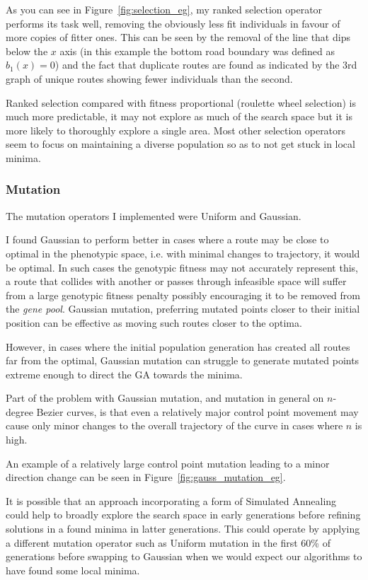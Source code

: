 As you can see in Figure~\ref{fig:selection_eg}, my ranked selection operator performs its task well, removing the obviously less fit individuals in favour of more copies of  fitter ones. This can be seen by the removal of the line that dips below the $x$ axis (in this example the bottom road boundary was defined as $b_{1}(x) = 0 $) and the fact that duplicate routes are found as indicated by the 3rd graph of unique routes showing fewer individuals than the second.

Ranked selection compared with fitness proportional (roulette wheel selection) is much more predictable, it may not explore as much of the search space but it is more likely to thoroughly explore a single area. Most other selection operators seem to focus on maintaining a diverse population so as to not get stuck in local minima.

\subsubsection{Mutation}

The mutation operators I implemented were Uniform and Gaussian.

I found Gaussian to perform better in cases where a route may be close to optimal in the phenotypic space, i.e. with minimal changes to trajectory, it would be optimal. In such cases the genotypic fitness may not accurately represent this, a route that collides with another or passes through infeasible space will suffer from a large genotypic fitness penalty possibly encouraging it to be removed from the \textit{gene pool}. Gaussian mutation, preferring mutated points closer to their initial position can be effective as moving such routes closer to the optima.

However, in cases where the initial population generation has created all routes far from the optimal, Gaussian mutation can struggle to generate mutated points extreme enough to direct the GA towards the minima.

Part of the problem with Gaussian mutation, and mutation in general on $n$-degree Bezier curves, is that even a relatively major control point movement may cause only minor changes to the overall trajectory of the curve in cases where $n$ is high.

An example of a relatively large control point mutation leading to a minor direction change can be seen in Figure~\ref{fig:gauss_mutation_eg}.

It is possible that an approach incorporating a form of Simulated Annealing could help to broadly explore the search space in early generations before refining solutions in a found minima in latter generations. This could operate by applying a different mutation operator such as Uniform mutation in the first 60\% of generations before swapping to Gaussian when we would expect our algorithms to have found some local minima.

